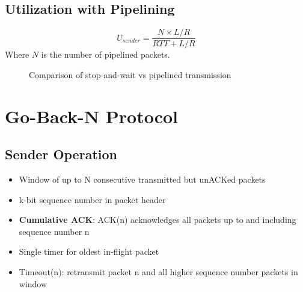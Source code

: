 \documentclass[12pt]{article}
\begin{document}
\subsection{Utilization with Pipelining}
\[
    U_{sender} = \frac{N \times L/R}{RTT + L/R}
\]
Where $N$ is the number of pipelined packets.

\begin{figure}[h]
    \centering
    \caption{Comparison of stop-and-wait vs pipelined transmission}
    \label{fig:pipelining_comparison}
\end{figure}

\section{Go-Back-N Protocol}

\subsection{Sender Operation}
\begin{itemize}
    \item Window of up to N consecutive transmitted but unACKed packets
    \item k-bit sequence number in packet header
    \item \textbf{Cumulative ACK}: ACK(n) acknowledges all packets up to and including sequence number n
    \item Single timer for oldest in-flight packet
    \item Timeout(n): retransmit packet n and all higher sequence number packets in window
\end{itemize}
\end{document}
